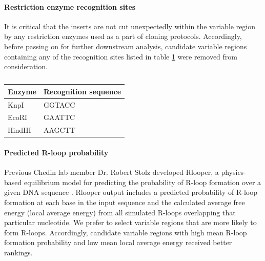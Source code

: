 \documentclass[11pt]{article}
\begin{document}
\paragraph{Restriction enzyme recognition sites}

It is critical that the inserts are not cut unexpectedly within the variable region by any restriction enzymes used as a part of cloning protocols. Accordingly, before passing on for further downstream analysis, candidate variable regions containing any of the recognition sites listed in table \ref{tab:enzymes} were removed from consideration.

\begin{table}[H]
	\caption{}
	\label{tab:enzymes}
	\centering
	\begin{tabular}{@{}ll@{}}
		\toprule
		Enzyme  & Recognition sequence \\ \midrule
		KnpI    & GGTACC               \\
		EcoRI   & GAATTC               \\
		HindIII & AAGCTT               \\ \bottomrule
	\end{tabular}
\end{table}


\paragraph{Predicted R-loop probability}

Previous Chedin lab member Dr. Robert Stolz developed Rlooper, a physics-based equilibrium model for predicting the probability of R-loop formation over a given DNA sequence \cite{Stolz2019}. Rlooper output includes a predicted probability of R-loop formation at each base in the input sequence and the calculated average free energy (local average energy) from all simulated R-loops overlapping that particular nucleotide. We prefer to select variable regions that are more likely to form R-loops. Accordingly, candidate variable regions with high mean R-loop formation probability and low mean local average energy received better rankings.
\end{document}

